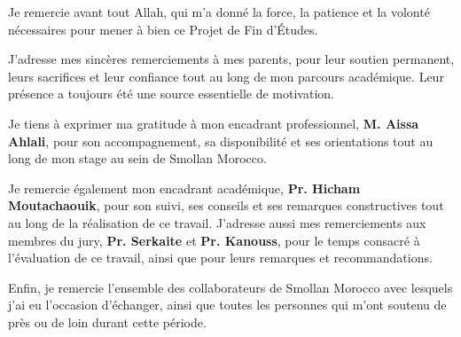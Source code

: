 {}
\thispagestyle{frontmatterstyle}


\begin{center}
\begin{minipage}{0.78\textwidth}
\justifying
\setlength{\parindent}{0.7cm}
\setlength{\parskip}{11pt}

Je remercie avant tout Allah, qui m’a donné la force, la patience et la volonté nécessaires pour mener à bien ce Projet de Fin d’Études.

J’adresse mes sincères remerciements à mes parents, pour leur soutien permanent, leurs sacrifices et leur confiance tout au long de mon parcours académique. Leur présence a toujours été une source essentielle de motivation.

Je tiens à exprimer ma gratitude à mon encadrant professionnel, \textbf{M. Aissa Ahlali}, pour son accompagnement, sa disponibilité et ses orientations tout au long de mon stage au sein de Smollan Morocco.

Je remercie également mon encadrant académique, \textbf{Pr. Hicham Moutachaouik}, pour son suivi, ses conseils et ses remarques constructives tout au long de la réalisation de ce travail. J’adresse aussi mes remerciements aux membres du jury, \textbf{Pr. Serkaite} et \textbf{Pr. Kanouss}, pour le temps consacré à l’évaluation de ce travail, ainsi que pour leurs remarques et recommandations.

Enfin, je remercie l’ensemble des collaborateurs de Smollan Morocco avec lesquels j’ai eu l’occasion d’échanger, ainsi que toutes les personnes qui m’ont soutenu de près ou de loin durant cette période.

\end{minipage}
\end{center}
